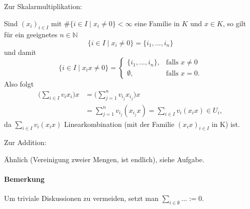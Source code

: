 Zur Skalarmultiplikation:
        \begin{addmargin}[25pt]{0pt}
	Sind $(x_i)_{i\in I}$ mit $\#\{i\in I \mid x_i \neq 0\}<\infty$ eine Familie in $ K $ und $x\in K$, so gilt für ein geeignetes $n\in \mathbb{N}$
		\[ \{i\in I\mid x_i \neq 0\} = \{i_1, ... , i_n\} \]
	und damit
	\begin{equation*}
		\{i\in I\mid x_ix\neq 0\} =
		\begin{cases}
			\{{i_1,...,i_n\}},& \text{falls }x \neq 0\\
			\emptyset,& \text{falls }x = 0.
		\end{cases}
	\end{equation*}
	Also folgt
	\begin{align*}
		\bigg(\sum_{i\in I}v_i x_i\bigg) x &= \bigg(\sum_{j=1}^{n} v_{i_j}x_{i_j}\bigg)x\\
		&= \sum_{j=1}^{n} v_{i_j}(x_{i_j}x) = \sum_{i\in I} v_i(x_ix) \in U_i,
	\end{align*}
	da $\sum_{i\in I} v_i(x_ix)$ Linearkombination (mit der Familie $(x_ix)_{i\in I}$ in K) ist.
	\end{addmargin}

Zur Addition:
        \begin{addmargin}[25pt]{0pt}
            Ähnlich (Vereinigung zweier Mengen, ist endlich), siehe Aufgabe.
	\end{addmargin}
	
\paragraph{Bemerkung}
	Um triviale Diskussionen zu vermeiden, setzt man $\sum_{i\in \emptyset} ...:=0$.
